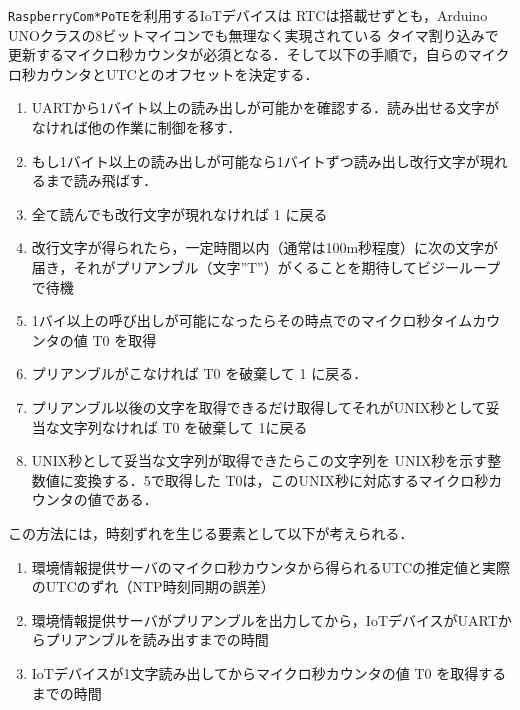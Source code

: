 
 \par


{\tt Raspberry\-Com*PoTE}を利用するIoTデバイスは RTCは搭載せずとも，Arduino UNOクラスの8ビットマイコンでも無理なく実現されている タイマ割り込みで更新するマイクロ秒カウンタが必須となる．そして以下の手順で，自らのマイクロ秒カウンタとUTCとのオフセットを決定する．

\begin{enumerate}
\item UARTから1バイト以上の読み出しが可能かを確認する．読み出せる文字がなければ他の作業に制御を移す．
\item もし1バイト以上の読み出しが可能なら1バイトずつ読み出し改行文字が現れるまで読み飛ばす．
\item 全て読んでも改行文字が現れなければ 1 に戻る
\item 改行文字が得られたら，一定時間以内（通常は100m秒程度）に次の文字が届き，それがプリアンブル（文字''T''）がくることを期待してビジーループで待機
\item 1バイ以上の呼び出しが可能になったらその時点でのマイクロ秒タイムカウンタの値 T0 を取得
\item プリアンブルがこなければ T0 を破棄して 1 に戻る．
\item プリアンブル以後の文字を取得できるだけ取得してそれがUNIX秒として妥当な文字列なければ T0 を破棄して 1に戻る
\item UNIX秒として妥当な文字列が取得できたらこの文字列を UNIX秒を示す整数値に変換する．5で取得した T0は，このUNIX秒に対応するマイクロ秒カウンタの値である．
\end{enumerate}

この方法には，時刻ずれを生じる要素として以下が考えられる．

\begin{enumerate}
\item 環境情報提供サーバのマイクロ秒カウンタから得られるUTCの推定値と実際のUTCのずれ（NTP時刻同期の誤差）
\item 環境情報提供サーバがプリアンブルを出力してから，IoTデバイスがUARTからプリアンブルを読み出すまでの時間
\item IoTデバイスが1文字読み出してからマイクロ秒カウンタの値 T0 を取得するまでの時間
\end{enumerate}

